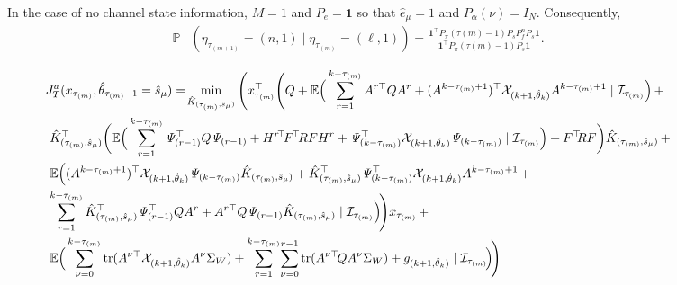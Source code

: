 \documentclass[journal,twoside,web]{ieeecolor}
\begin{document}
\begin{figure*}[ht]
\raggedright
In the case of no channel state information, $M=1$ and $P_e = \mathbf{1}$ so that $\hat{e}_{\mu}=1$ and $P_{\alpha}(\nu) = I_{N}$. Consequently,
\begin{align*}
        \mathbb{P}&(\eta_{\tau_{(m+1)}}^{} = (n,1) \mid \eta_{\tau_{(m)}}^{} = (\ell,1)) = \frac{\mathbf{1}^{\top} P_{\pi}(\tau{(m)}-1) P_{s} P_{f}^{n} P_{s} \mathbf{1}}{\mathbf{1}^{\top} P_{\pi}(\tau{(m)}-1) P_{s}\mathbf{1}}.  
    \end{align*}
\end{figure*}

\begin{figure*}[ht]
\raggedright
\begin{align}\label{eq:cost-tau1}
\begin{aligned}
 & \text{\small $J_{T}^{a}(x_{\tau_{(m)}},\hat{\theta}_{\tau_{(m)}-1}=\hat{s}_{\mu}) = \!
    \min_{\hat{K}_{(\tau_{(m)},\hat{s}_{\mu})}} \Bigg( x_{\tau_{(m)}}^{\top} \Bigg(Q + \mathbb{E} \Big( \sum_{r=1}^{k-\tau_{(m)}} A^{r \top} Q A^{r}  + (A^{k-\tau_{(m)}+1})^{\top} \mathcal{X}_{(k+1,\hat{\theta}_k)} A^{k-\tau_{(m)}+1}\mid \mathcal{I}_{\tau_{(m)}} \Big) \,+ $}\\
    & ~ \text{\small $\hat{K}_{(\tau_{(m)},\hat{s}_{\mu})}^{\top} \bigg( \mathbb{E} \Big( \sum_{r=1}^{k-\tau_{(m)}} \mathit{\Psi}_{(r-1)}^{\top} Q \mathit{\Psi}_{(r-1)} + H^{r \!\top} \! F^{\!\top} \! R F H^{r} + \mathit{\Psi}_{(k-\tau_{(m)})}^{\top} \mathcal{X}_{(k+1,\hat{\theta}_k)} \mathit{\Psi}_{(k-\tau_{(m)})} \mid \mathcal{I}_{\tau_{(m)}} \Big) + F^{\top}\!\! R F \bigg) \hat{K}_{(\tau_{(m)},\hat{s}_{\mu})} \,+ $} \\
    & ~ \text{\small  $\mathbb{E} \Big( (A^{k-\tau_{(m)}+1})^{\top} \mathcal{X}_{(k+1,\hat{\theta}_k)} \mathit{\Psi}_{(k-\tau_{(m)})} \hat{K}_{(\tau_{(m)},\hat{s}_{\mu})} + \hat{K}_{(\tau_{(m)},\hat{s}_{\mu})}^{\top} \mathit{\Psi}_{(k-\tau_{(m)})} ^{\top} \mathcal{X}_{(k+1,\hat{\theta}_k)} A^{k-\tau_{(m)}+1} \,+$} \\
    & ~ \text{\small $ \sum_{r=1}^{k-\tau_{(m)}}\hat{K}_{(\tau_{(m)},\hat{s}_{\mu})}^{\top} \mathit{\Psi}_{(r-1)}^{\top} Q A^{r} +  A^{r \top} Q \mathit{\Psi}_{(r-1)} \hat{K}_{(\tau_{(m)},\hat{s}_{\mu})} 
    \mid \mathcal{I}_{\tau_{(m)}} \Big) \! \Bigg) x_{\tau_{(m)}} \,+$} \\
    & ~ \text{\small $\mathbb{E} \Big( \sum_{\nu=0}^{k-\tau_{(m)}} \mathop{\mathrm{tr}} (A^{\nu \top}  \mathcal{X}_{(k+1,\hat{\theta}_k)} A^{\nu} \Sigma_W) +\sum_{r=1}^{k-\tau_{(m)}} \!\sum_{\nu=0}^{r-1} \mathop{\mathrm{tr}} (A^{\nu \top} \! Q A^{\nu} \Sigma_W) + g_{(k+1,\hat{\theta}_k)} \mid \mathcal{I}_{\tau_{(m)}} \! \Big)\!\Bigg)$}

\end{aligned}
\end{align}
\end{figure*}
\end{document}
